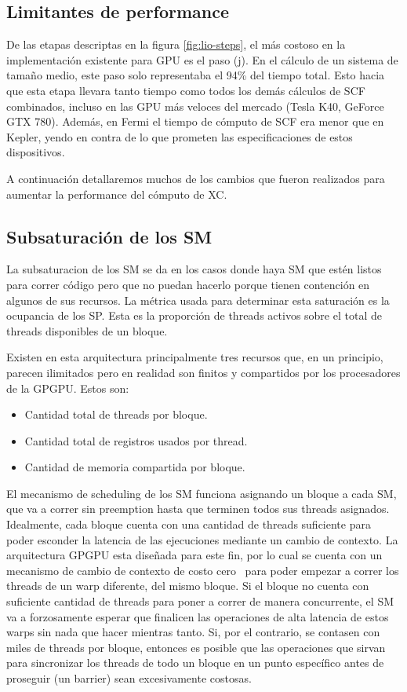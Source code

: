 \subsection{Limitantes de performance}

De las etapas descriptas en la figura \ref{fig:lio-steps}, el m\'as costoso
en la implementaci\'on existente para GPU es el paso (j). En el c\'alculo de un sistema
de tama\~no medio, este paso solo representaba el 94\% del tiempo total. Esto hacia
que esta etapa llevara tanto tiempo como todos los dem\'as c\'alculos de SCF combinados, incluso
en las GPU m\'as veloces del mercado (Tesla K40, GeForce GTX 780). Adem\'as, en Fermi
el tiempo de c\'omputo de SCF era menor que en Kepler, yendo en contra de lo que prometen
las especificaciones de estos dispositivos.



A continuaci\'on detallaremos muchos de los cambios que fueron realizados para aumentar
la performance del c\'omputo de XC.

\subsection{Subsaturaci\'on de los SM}
La subsaturacion de los SM se da en los casos donde haya SM que est\'en listos para correr
c\'odigo pero que no puedan hacerlo porque tienen contenci\'on en algunos de sus recursos.
La m\'etrica usada para determinar esta saturaci\'on es la ocupancia de los SP.
Esta es la proporci\'on de threads activos sobre el total de threads disponibles de un bloque.

Existen en esta arquitectura principalmente tres recursos que, en un principio, parecen
ilimitados pero en realidad son finitos y compartidos por los procesadores de la GPGPU.
Estos son:
\begin{itemize}
\item Cantidad total de threads por bloque.
\item Cantidad total de registros usados por thread.
\item Cantidad de memoria compartida por bloque.
\end{itemize}

El mecanismo de scheduling de los SM funciona asignando un bloque a cada SM, que
va a correr sin preemption hasta que terminen todos sus threads asignados. Idealmente, cada
bloque cuenta con una cantidad de threads suficiente para poder esconder la latencia
de las ejecuciones mediante un cambio de contexto. La arquitectura GPGPU esta dise\~nada
para este fin, por lo cual se cuenta con un mecanismo de cambio de contexto de costo cero~\cite{NvidiaFermi} para
poder empezar a correr los threads de un warp diferente, del mismo bloque.
Si el bloque no cuenta con suficiente cantidad de threads para poner a correr de manera
concurrente, el SM va a forzosamente esperar que finalicen las operaciones de alta latencia
de estos warps sin nada que hacer mientras tanto. Si, por el contrario, se contasen con
miles de threads por bloque, entonces es posible que las operaciones que sirvan
para sincronizar los threads de todo un bloque en un punto espec\'ifico antes de proseguir
(un barrier) sean excesivamente costosas.

